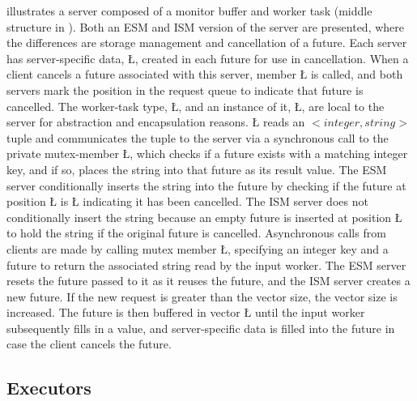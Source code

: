 \documentclass[openright,twoside]{report}
\begin{document}
 illustrates a server composed of a monitor buffer and worker task (middle structure in ).
Both an ESM and ISM version of the server are presented, where the differences are storage management and cancellation of a future.
Each server has server-specific data, \LGinlinetrue\LGbegin\lgrinde\L{}\endlgrinde\LGend{}, created in each future for use in cancellation.
When a client cancels a future associated with this server, member \LGinlinetrue\LGbegin\lgrinde\L{}\endlgrinde\LGend{} is called, and both servers mark the position in the request queue to indicate that future is cancelled.
The worker-task type, \LGinlinetrue\LGbegin\lgrinde\L{}\endlgrinde\LGend{}, and an instance of it, \LGinlinetrue\LGbegin\lgrinde\L{}\endlgrinde\LGend{}, are local to the server for abstraction and encapsulation reasons.
\LGinlinetrue\LGbegin\lgrinde\L{}\endlgrinde\LGend{} reads an $<integer, string>$ tuple and communicates the tuple to the server via a synchronous call to the private mutex-member \LGinlinetrue\LGbegin\lgrinde\L{}\endlgrinde\LGend{}, which checks if a future exists with a matching integer key, and if so, places the string into that future as its result value.
The ESM server conditionally inserts the string into the future by checking if the future at position \LGinlinetrue\LGbegin\lgrinde\L{}\endlgrinde\LGend{} is \LGinlinetrue\LGbegin\lgrinde\L{}\endlgrinde\LGend{} indicating it has been cancelled.
The ISM server does not conditionally insert the string because an empty future is inserted at position \LGinlinetrue\LGbegin\lgrinde\L{}\endlgrinde\LGend{} to hold the string if the original future is cancelled.
Asynchronous calls from clients are made by calling mutex member \LGinlinetrue\LGbegin\lgrinde\L{}\endlgrinde\LGend{}, specifying an integer key and a future to return the associated string read by the input worker.
The ESM server resets the future passed to it as it reuses the future, and the ISM server creates a new future.
If the new request is greater than the vector size, the vector size is increased.
The future is then buffered in vector \LGinlinetrue\LGbegin\lgrinde\L{}\endlgrinde\LGend{} until the input worker subsequently fills in a value, and server-specific data is filled into the future in case the client cancels the future.


\subsection{Executors}
\label{s:Executors}
\end{document}

